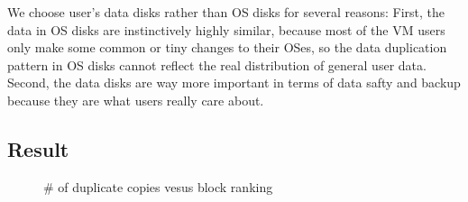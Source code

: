 We choose user's data disks rather than OS disks for several reasons: First, the data in OS disks are 
instinctively highly similar, because most of the VM users only make some common or tiny changes to their OSes,
so the data duplication pattern in OS disks cannot reflect the real distribution of general user data.
Second, the data disks are way more important in terms of data safty and backup because they are 
what users really care about.

\subsection{Result}
\begin{figure}
\centering
{}
\caption{# of duplicate copies vesus block ranking}
\label{figure:zipf}
\end{figure}
